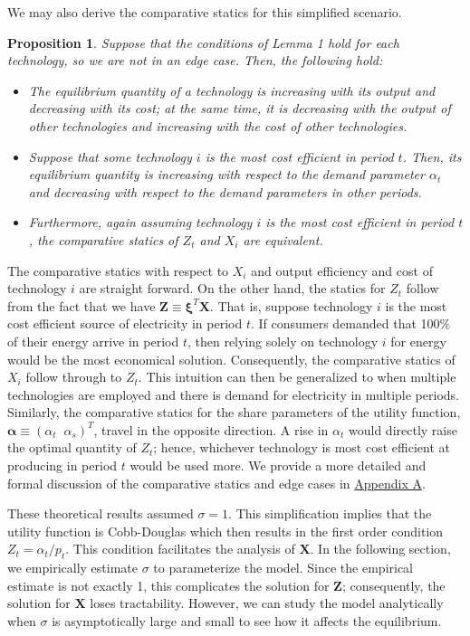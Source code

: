 \documentclass[11pt,a4paper,leqno]{extarticle}
\newtheorem{proposition}{Proposition}
\begin{document}
	We may also derive the comparative statics for this simplified scenario.  
	\begin{proposition}
		Suppose that the conditions of Lemma 1 hold for each technology, so we are not in an edge case. Then, the following hold:
		\begin{itemize}
			\item The equilibrium quantity of a technology is increasing with its output and decreasing with its cost; at the same time, it is decreasing with the output of other technologies and increasing with the cost of other technologies. 
			\item Suppose that some technology $i$ is the most cost efficient in period $t$. Then, its equilibrium quantity is increasing with respect to the demand parameter $\alpha_t$ and decreasing with respect to the demand parameters in other periods. 
			\item Furthermore, again assuming technology $i$ is the most cost efficient in period $t$, the comparative statics of $Z_t$ and $X_i$ are equivalent. 
		\end{itemize}
	\end{proposition}		
	The comparative statics with respect to $X_i$ and output efficiency and cost of technology $i$ are straight forward. On the other hand, the statics for $Z_t$  follow from the fact that we have $\mathbf{Z} \equiv \boldsymbol{\xi}^T \mathbf{X}$. That is, suppose technology $i$ is the most cost efficient source of electricity in period $t$. If consumers demanded that 100\% of their energy arrive in period $t$, then relying solely on technology $i$ for energy would be the most economical solution. Consequently, the comparative statics of $X_i$ follow through to $Z_t$. This intuition can then be generalized to when multiple technologies are employed and there is demand for electricity in multiple periods. Similarly, the comparative statics for the share parameters of the utility function, $\boldsymbol{\alpha} \equiv \left( \alpha_t \;\; \alpha_s \right)^T$, travel in the opposite direction. A rise in $\alpha_t$ would directly raise the optimal quantity of $Z_t$; hence, whichever technology is most cost efficient at producing in period $t$ would be used more. We provide a more detailed and formal discussion of the comparative statics and edge cases in \hyperref[sec:appendixa]{Appendix A}. 
	
	These theoretical results assumed $\sigma = 1$. This simplification implies that the utility function is Cobb-Douglas which then results in the first order condition $Z_t = \alpha_t/p_t$. This condition facilitates the analysis of $\mathbf{X}$. In the following section, we empirically estimate $\sigma$ to parameterize the model. Since the empirical estimate is not exactly 1, this complicates the solution for $\mathbf{Z}$; consequently, the solution for $\mathbf{X}$ loses tractability. However, we can study the model analytically when $\sigma$ is asymptotically large and small to see how it affects the equilibrium. 
		
\end{document}
